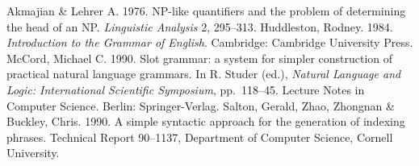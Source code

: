 \documentclass{nle}
\begin{document}
\begin{thebibliography}{}
   Akmajian \& Lehrer A. 1976. NP-like quantifiers and the
   problem of determining the head of an NP. {\it Linguistic
   Analysis\/} {2}, 295--313.
   Huddleston, Rodney. 1984. {\it Introduction to the Grammar of
   English}. Cambridge: Cambridge University Press.
   McCord, Michael C. 1990. Slot grammar: a system for simpler
   construction of practical natural language grammars. In R.
   Studer (ed.), {\it Natural Language and Logic: International
   Scientific Symposium}, pp.~118--45. Lecture Notes in Computer
   Science. Berlin: Springer-Verlag.
   Salton, Gerald, Zhao, Zhongnan \& Buckley, Chris. 1990.
   A simple syntactic approach for the generation of indexing
   phrases. Technical Report 90--1137, Department of Computer
   Science, Cornell University.
\end{thebibliography}

\label{lastpage}
\end{document}
